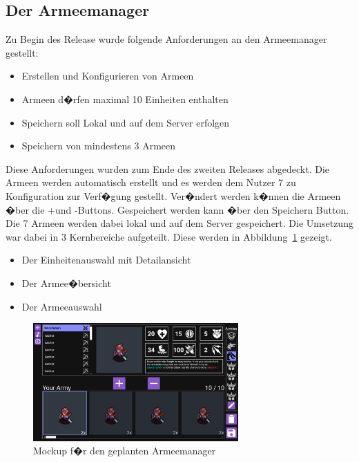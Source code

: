 \documentclass[12pt, titlepage]{scrartcl}
\newcommand{\Abb}[1]{%
	Abbildung\ \ref{#1}%
}
\begin{document}
			\subsection{Der Armeemanager}
			Zu Begin des Release wurde folgende Anforderungen an den Armeemanager gestellt:
			\begin{itemize}
				\item Erstellen und Konfigurieren von Armeen
				\item Armeen d�rfen maximal 10 Einheiten enthalten
				\item Speichern soll Lokal und auf dem Server erfolgen
				\item Speichern von mindestens 3 Armeen
			\end{itemize}
			Diese Anforderungen wurden zum Ende des zweiten Releases abgedeckt. Die Armeen werden automatisch erstellt und es werden dem Nutzer 7 zu Konfiguration zur Verf�gung gestellt. Ver�ndert werden k�nnen die Armeen �ber die \glqq +\grqq und \glqq -\grqq Buttons. Gespeichert werden kann �ber den Speichern Button. Die 7 Armeen werden dabei lokal und auf dem Server gespeichert. Die Umsetzung war dabei in 3 Kernbereiche aufgeteilt. Diese werden in \Abb{MockUpArmeemanager} gezeigt.
			\begin{itemize}
				\item Der Einheitenauswahl mit Detailansicht
				\item Der Armee�bersicht
				\item Der Armeeauswahl
			\end{itemize} 
		
			\begin{figure}[H] 
				\centering
				\includegraphics[width=0.7\textwidth]{ArmyBuilderMockUp.png}
				\caption{Mockup f�r den geplanten Armeemanager}
				\label{MockUpArmeemanager}
			\end{figure}
			
\end{document}
